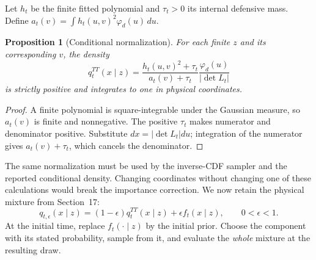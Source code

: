 \documentclass[11pt]{article}
\newtheorem{proposition}{Proposition}
\begin{document}
Let $h_t$ be the finite fitted polynomial and $\tau_t>0$ its internal
defensive mass. Define $a_t(v)=\int h_t(u,v)^2\varphi_d(u)\,du$.
\begin{proposition}[Conditional normalization]
\label{prop:a11-conditional}
For each finite $z$ and its corresponding $v$, the density
\begin{equation}
 q_t^{TT}(x\mid z)=
 \frac{h_t(u,v)^2+\tau_t}{a_t(v)+\tau_t}
 \frac{\varphi_d(u)}{|\det L_t|}
 \label{eq:a11-conditional}
\end{equation}
is strictly positive and integrates to one in physical coordinates.
\end{proposition}
\begin{proof}
A finite polynomial is square-integrable under the Gaussian measure, so
$a_t(v)$ is finite and nonnegative. The positive $\tau_t$ makes numerator
and denominator positive. Substitute $dx=|\det L_t|du$; integration of the
numerator gives $a_t(v)+\tau_t$, which cancels the denominator.
\end{proof}

The same normalization must be used by the inverse-CDF sampler and the
reported conditional density. Changing coordinates without changing one of
these calculations would break the importance correction. We now retain
the physical mixture from Section~17:
\begin{equation}
 q_{t,\epsilon}(x\mid z)=(1-\epsilon)q_t^{TT}(x\mid z)
                  +\epsilon f_t(x\mid z),\qquad 0<\epsilon<1.
 \label{eq:a11-mixture}
\end{equation}
At the initial time, replace $f_t(\cdot\mid z)$ by the initial prior.
Choose the component with its stated probability, sample from it, and
evaluate the \emph{whole} mixture at the resulting draw.
\end{document}
